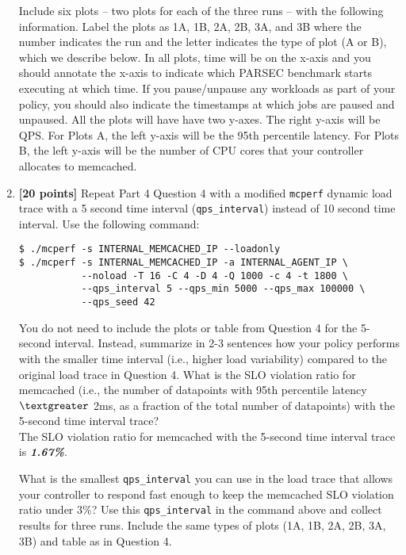 \documentclass[11pt]{article}
\begin{document}
\begin{enumerate}
   Include six plots -- two plots for each of the three runs -- with the following information. Label the plots as 1A, 1B, 2A, 2B, 3A, and 3B where the number indicates the run and the letter indicates the type of plot (A or B), which we describe below. In all plots, time will be on the x-axis and you should annotate the x-axis to indicate which PARSEC benchmark starts executing at which time. If you pause/unpause any workloads as part of your policy, you should also indicate the timestamps at which jobs are paused and unpaused. All the plots will have have two y-axes. The right y-axis will be QPS. For Plots A, the left y-axis will be the 95th percentile latency. For Plots B, the left y-axis will be the number of CPU cores that your controller allocates to memcached. 


    \item \textbf{[20 points]} Repeat Part 4 Question 4 with a modified \texttt{mcperf} dynamic load trace with a 5 second time interval (\texttt{qps\_interval}) instead of 10 second time interval. Use the following command: 
    
                \begin{Verbatim}[fontsize=\small]
$ ./mcperf -s INTERNAL_MEMCACHED_IP --loadonly 
$ ./mcperf -s INTERNAL_MEMCACHED_IP -a INTERNAL_AGENT_IP \ 
           --noload -T 16 -C 4 -D 4 -Q 1000 -c 4 -t 1800 \ 
           --qps_interval 5 --qps_min 5000 --qps_max 100000 \ 
           --qps_seed 42
\end{Verbatim}
    
    You do not need to include the plots or table from Question 4 for the 5-second interval. Instead, summarize in 2-3 sentences how your policy performs with the smaller time interval (i.e., higher load variability) compared to the original load trace in Question 4. What is the SLO violation ratio for memcached (i.e., the number of datapoints with 95th percentile latency $\textgreater$ 2ms, as a fraction of the total number of datapoints)  with the 5-second time interval trace? \\
    
    The SLO violation ratio for memcached  with the 5-second time interval trace is \textbf{\emph{1.67\%}}.

    What is the smallest \texttt{qps\_interval} you can use in the load trace that allows your controller to respond fast enough to keep the memcached SLO violation ratio under 3\%? Use this \texttt{qps\_interval} in the command above and collect results for three runs. Include the same types of plots (1A, 1B, 2A, 2B, 3A, 3B) and table as in Question 4. 
    

\end{enumerate}
\end{document}
